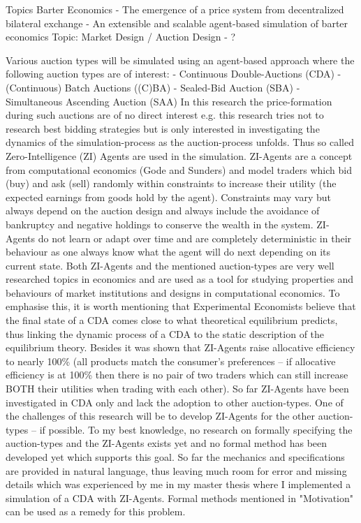\documentclass{article}
\begin{document}
Topics Barter Economics
- The emergence of a price system from decentralized bilateral exchange
- An extensible and scalable agent-based simulation of barter economics
Topic: Market Design / Auction Design
 - ?

Various auction types will be simulated using an agent-based approach where the following auction types are of interest:
- Continuous Double-Auctions (CDA)
- (Continuous) Batch Auctions ((C)BA)
- Sealed-Bid Auction (SBA)
- Simultaneous Ascending Auction (SAA)
In this research the price-formation during such auctions are of no direct interest e.g. this research tries not to research best bidding strategies but is only interested in investigating the dynamics of the simulation-process as the auction-process unfolds. Thus so called Zero-Intelligence (ZI) Agents are used in the simulation.
ZI-Agents are a concept from computational economics (Gode and Sunders) and model traders which bid (buy) and ask (sell) randomly within constraints to increase their utility (the expected earnings from goods hold by the agent). Constraints may vary but always depend on the auction design and always include the avoidance of bankruptcy and negative holdings to conserve the wealth in the system. ZI-Agents do not learn or adapt over time and are completely deterministic in their behaviour as one always know what the agent will do next depending on its current state.
Both ZI-Agents and the mentioned auction-types are very well researched topics in economics and are used as a tool for studying properties and behaviours of market institutions and designs in computational economics. To emphasise this, it is worth mentioning that Experimental Economists believe that the final state of a CDA comes close to what theoretical equilibrium predicts, thus linking the dynamic process of a CDA to the static description of the equilibrium theory. Besides it was shown that ZI-Agents raise allocative efficiency to nearly 100\% (all products match the consumer’s preferences – if allocative efficiency is at 100\% then there is no pair of two traders which can still increase BOTH their utilities when trading with each other).
So far ZI-Agents have been investigated in CDA only and lack the adoption to other auction-types. One of the challenges of this research will be to develop ZI-Agents for the other auction-types – if possible.
To my best knowledge, no research on formally specifying the auction-types and the ZI-Agents exists yet and no formal method has been developed yet which supports this goal. So far the mechanics and specifications are provided in natural language, thus leaving much room for error and missing details which was experienced by me in my master thesis where I implemented a simulation of a CDA with ZI-Agents. Formal methods mentioned in "Motivation" can be used as a remedy for this problem. 
\end{document}
